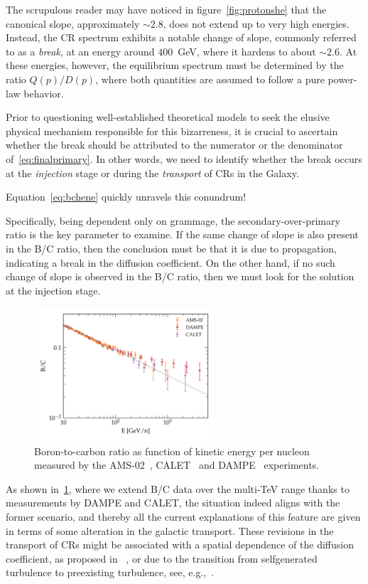The scrupulous reader may have noticed in figure~\ref{fig:protonshe} that the canonical slope, approximately $\sim 2.8$, does not extend up to very high energies. Instead, the CR spectrum exhibits a notable change of slope, commonly referred to as a \emph{break}, at an energy around $400$~GeV, where it hardens to about $\sim 2.6$.
%
At these energies, however, the equilibrium spectrum must be determined by the ratio $Q(p)/D(p)$, where both quantities are assumed to follow a pure power-law behavior. 

Prior to questioning well-established theoretical models to seek the elusive physical mechanism responsible for this bizarreness, it is crucial to ascertain whether the break should be attributed to the numerator or the denominator of~\ref{eq:finalprimary}. 
%
In other words, we need to identify whether the break occurs at the \emph{injection} stage or during the \emph{transport} of CRs in the Galaxy.

Equation~\eqref{eq:bchene} quickly unravels this conundrum! 

Specifically, being dependent only on grammage, the secondary-over-primary ratio is the key parameter to examine. 
%
If the same change of slope is also present in the B/C ratio, then the conclusion must be that it is due to propagation, indicating a break in the diffusion coefficient. On the other hand, if no such change of slope is observed in the B/C ratio, then we must look for the solution at the injection stage.

\begin{figure}
\centering
\includegraphics[width=0.6\textwidth]{figures/BC_highenergy.pdf}
\caption{Boron-to-carbon ratio as function of kinetic energy per nucleon measured by the AMS-02~\cite{AMS02results}, CALET~\cite{CALET.2022.BC} and DAMPE~\cite{DAMPE.2022.BC} experiments.}
\label{fig:bchighen}
\end{figure}

As shown in~\ref{fig:bchighen}, where we extend B/C data over the multi-TeV range thanks to measurements by DAMPE and CALET, the situation indeed aligns with the former scenario, and thereby all the current explanations of this feature are given in terms of some alteration in the galactic transport. 
%
These revisions in the transport of CRs might be associated with a spatial dependence of the diffusion coefficient, as proposed in ~\cite{Tomassetti2012apj}, or due to the transition from selfgenerated turbulence to preexisting turbulence, see, e.g.,~\cite{Evoli2018prl}.

